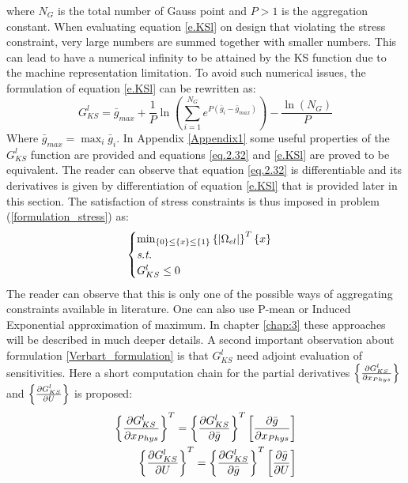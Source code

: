 where $N_G$  is the total number of Gauss point and $P>1$ is the aggregation constant. When evaluating equation \eqref{e.KSl} on design that violating the stress constraint, very large numbers are summed together with smaller numbers. This can lead to have a numerical infinity to be attained by the KS function due to the machine representation limitation.
To avoid such numerical issues, the formulation of equation \eqref{e.KSl} can be rewritten as:
\begin{equation}
\label{eq.2.32}
G^{l}_{KS}=\bar{g}_{max}+\frac{1}{P}\ln\left(\sum_{i=1}^{N_G}e^{P\left(\bar{g}_i-\bar{g}_{max}\right)}\right)-\frac{\ln\left(N_G\right)}{P}
\end{equation}
Where $\bar{g}_{max}=\max_i\bar{g}_i$. In Appendix \ref{Appendix1} some useful properties of the $G_{KS}^l$ function are provided and equations \eqref{eq.2.32} and \eqref{e.KSl} are proved to be equivalent. The reader can observe that equation \eqref{eq.2.32} is differentiable and its derivatives is given by differentiation of equation \eqref{e.KSl} that is provided later in this section. 
The satisfaction of stress constraints is thus imposed in problem (\ref{formulation_stress}) as:
\begin{equation}
\begin{cases}
\label{Verbart_formulation}
\min_{\left\lbrace{0}\right \rbrace\leq\left\lbrace{x}\right \rbrace\leq\left\lbrace{1}\right \rbrace} {\left\lbrace{|\Omega_{el}|}\right \rbrace^T\left\lbrace{x}\right \rbrace} \\
\textit{s.t.}\\
G^{l}_{KS}\leq 0 
\end{cases}
\end{equation}
The reader can observe that this is only one of the possible ways of aggregating constraints available in literature.  One can also use P-mean \cite{duysinx1998new} or Induced Exponential \cite{kennedy2015improved} approximation of maximum. In chapter \ref{chap:3} these approaches will be described in much deeper details.
A second important observation about formulation \ref{Verbart_formulation} is that $G^{l}_{KS}$ need adjoint evaluation of sensitivities. Here a short computation chain for the partial derivatives $\left\lbrace{\frac{\partial G_{KS}^l}{\partial x_{Phys}}}\right \rbrace$ and  $\left\lbrace{\frac{\partial G_{KS}^l}{\partial U}}\right \rbrace$ is proposed:
\begin{eqnarray}
\left\lbrace{\frac{\partial G_{KS}^l}{\partial x_{Phys}}}\right \rbrace^T=\left\lbrace{\frac{\partial G_{KS}^l}{\partial \bar{g}}}\right \rbrace^T\left[{\frac{\partial  \bar{g}}{\partial x_{Phys}}}\right]\\
\left\lbrace{\frac{\partial G_{KS}^l}{\partial U}}\right \rbrace^T=\left\lbrace{\frac{\partial G_{KS}^l}{\partial \bar{g}}}\right \rbrace^T\left[{\frac{\partial  \bar{g}}{\partial U}}\right]
\end{eqnarray}
